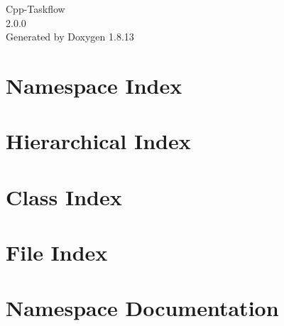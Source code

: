 \documentclass[twoside]{book}
\newcommand{\+}{\discretionary{\mbox{\scriptsize$\hookleftarrow$}}{}{}}
\newcommand{\clearemptydoublepage}{%
  \newpage{\pagestyle{empty}\cleardoublepage}%
}
\begin{document}
\hypersetup{pageanchor=false,
             bookmarksnumbered=true,
             pdfencoding=unicode
            }
\begin{titlepage}
\vspace*{7cm}
\begin{center}%
{\Large Cpp-\/\+Taskflow \\[1ex]\large 2.\+0.\+0 }\\
\vspace*{1cm}
{\large Generated by Doxygen 1.8.13}\\
\end{center}
\end{titlepage}
\clearemptydoublepage
{}
\tableofcontents
\clearemptydoublepage
{}
\hypersetup{pageanchor=true}

\chapter{Namespace Index}

\chapter{Hierarchical Index}

\chapter{Class Index}

\chapter{File Index}

\chapter{Namespace Documentation}



\end{document}
